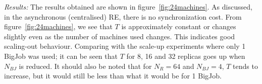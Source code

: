 \documentclass{rspublic}
\newcommand{\alnote}[1]{ {\textcolor{blue} { ***andre: #1 }}}
\newcommand{\alnote}[1]{}
\begin{document}


{\it Results:} The results obtained are shown in
figure~\ref{fig:24machines}.  As discussed, in the asynchronous
(centralised) RE, there is no synchronization cost.  From
figure~\ref{fig:24machines}, we see that $T$ is approximately constant
or changes slightly even as the number of machines used changes. This
indicates
good scaling-out behaviour. 
Comparing with the scale-up experiments where only 1 BigJob was used; it can be seen 
that $T$ for 8, 16 and 32 replicas goes up when $N_{BJ}$ is
reduced. It should also be noted that for $N_R = 64$ and $N_{BJ} =4$,
$T$ tends to increase, but it would still be less than what it would
be for 1 BigJob. %





\end{document}
